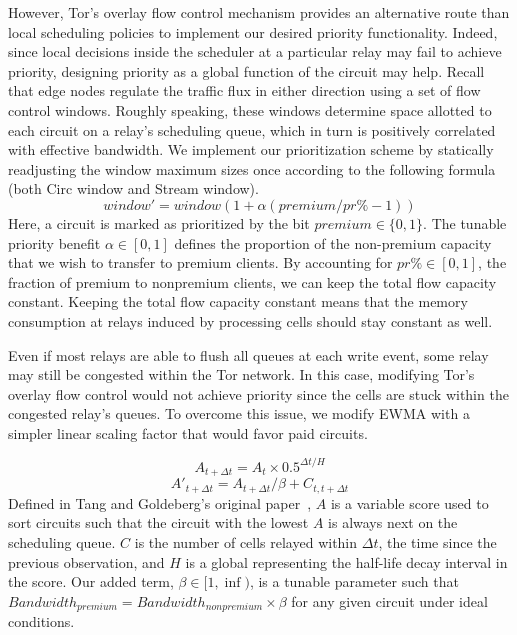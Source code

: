 However, Tor's overlay flow control mechanism provides an alternative route than
local scheduling policies to implement our desired priority functionality.
Indeed, since local decisions inside the scheduler at a particular relay may
fail to achieve priority, designing priority as a global function of the circuit
may help. Recall that edge nodes regulate the traffic flux in either direction
using a set of flow control windows. Roughly speaking, these windows determine
space allotted to each circuit on a relay's scheduling queue, which in turn is
positively correlated with effective bandwidth. We implement our prioritization
scheme by statically readjusting the window maximum sizes once according to the
following formula (both Circ window and Stream window).
\begin{equation}
  window' = window(1+ \alpha(premium / pr\% - 1))
  \label{eq:flow}
\end{equation}
Here, a circuit is marked as prioritized by the bit $premium \in \{0, 1\}$. The
tunable priority benefit $\alpha \in [0, 1]$ defines the proportion of the
non-premium capacity that we wish to transfer to premium clients. By accounting
for $pr\% \in [0,1]$, the fraction of premium to nonpremium clients, we can keep
the total flow capacity constant. Keeping the total flow capacity constant means
that the memory consumption at relays induced by processing cells should stay
constant as well.

Even if most relays are able to flush all queues at each write event, some relay
may still be congested within the Tor network. In this case, modifying Tor's
overlay flow control would not achieve priority since the cells are stuck within
the congested relay's queues. To overcome this issue, we modify EWMA with a
simpler linear scaling factor that would favor paid circuits.

\begin{equation}
  A_{t + \Delta t} = A_t \times 0.5^{\Delta t/H}
\end{equation}
\begin{equation}
  A'_{t + \Delta t} = A_{t + \Delta t} / \beta + C_{t, t + \Delta t}
\end{equation}
Defined in Tang and Goldeberg's original paper~\cite{tang2010improved}, $A$ is a
variable score used to sort circuits such that the circuit with the lowest $A$
is always next on the scheduling queue. $C$ is the number of cells relayed
within $\Delta t$, the time since the previous observation, and $H$ is a global
representing the half-life decay interval in the score. Our added term, $\beta
\in [1, \inf)$, is a tunable parameter such that $Bandwidth_{premium} =
  Bandwidth_{nonpremium} \times \beta$ for any given circuit under ideal
  conditions.


